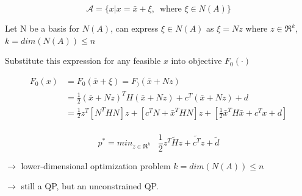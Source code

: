\begin{equation*}
\mathcal{A} =\{x | x = \bar{x} + \xi,\,\,\, \text{where } \xi \in N(A) \}
\end{equation*}

Let N be a basis for $N(A)$, can express $\xi \in N(A)$ as $\xi = Nz$ where $z\in \Re^k$, $k =dim(N(A)) \leq n$


Substitute this expression for any feasible $x$ into objective $F_0(\cdot)$


\begin{align*}
F_0(x) &= F_0(\bar{x} + \xi) = F_)(\bar{x} + Nz)\\
&= \frac{1}{2}(\bar{x} + Nz)^TH(\bar{x}+Nz) + c^T(\bar{x} + Nz) + d\\
&= \frac{1}{2}z^T[N^THN]z + [c^TN + \bar{x}^THN]z + [\frac{1}{2}\bar{x}^TH\bar{x} + c^Tx + d] \\
\end{align*}

\begin{equation*}
p^* = min_{z\in \Re^k}\,\,\,\,\, \frac{1}{2}z^T\tilde{H}z + \tilde{c^T}z + \tilde{d}
\end{equation*}

$\rightarrow$ lower-dimensional optimization problem $k =dim(N(A)) \leq n $

$\rightarrow$ still a QP, but an unconstrained QP.



